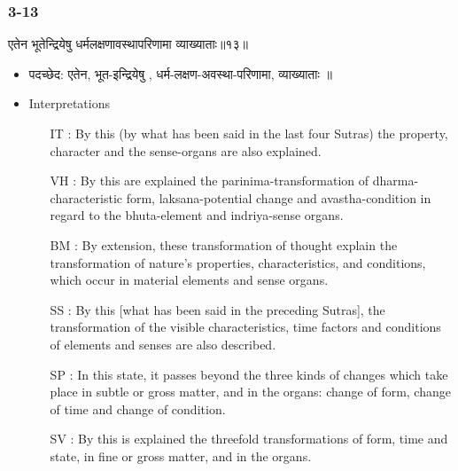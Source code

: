 \begin{frame}[fragile]\frametitle{3-13}
\begin{sanskrit}
एतेन भूतेन्द्रियेषु धर्मलक्षणावस्थापरिणामा व्याख्याताः॥१३॥
\end{sanskrit}

	\begin{itemize}
	\item पदच्छेद: एतेन, भूत-इन्द्रियेषु , धर्म-लक्षण-अवस्था-परिणामा, व्याख्याताः ॥
	\item Interpretations
		\begin{itemize}	
		\item [IT]: By this (by what has been said in the last four Sutras) the property, character and the sense-organs are also explained.
		\item [VH]: By this are explained the parinima-transformation of dharma-characteristic form, laksana-potential change and avastha-condition in regard to the bhuta-element and indriya-sense organs.
		\item [BM]: By extension, these transformation of thought explain the transformation of nature’s properties, characteristics, and conditions, which occur in material elements and sense organs.
		\item [SS]: By this [what has been said in the preceding Sutras], the transformation of the visible characteristics, time factors and conditions of elements and senses are also described.
		\item [SP]: In this state, it passes beyond the three kinds of changes which take place in subtle or gross matter, and in the organs: change of form, change of time and change of condition.
		\item [SV]: By this is explained the threefold transformations of form, time and state, in fine or gross matter, and in the organs. 
		\end{itemize}
	\end{itemize}
\end{frame}


